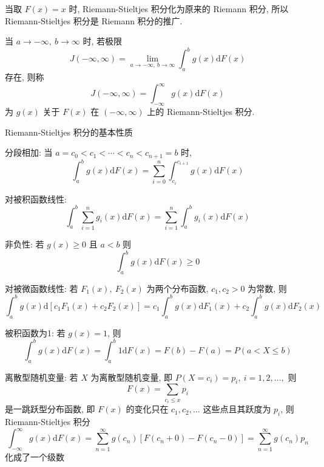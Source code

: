 \documentclass[openany]{ctexbook}
\theoremstyle{kaiti}
\theoremstyle{normal}
\begin{document}
当取 $F(x)=x$ 时, Riemann-Stieltjes 积分化为原来的 Riemann 积分, 所以 Riemann-Stieltjes 积分是 Riemann 积分的推广.

当 $a\to-\infty,~b\to\infty$ 时, 若极限
\begin{equation}
  J(-\infty,\infty)=\lim_{a\to-\infty,~b\to\infty}\int_a^bg(x)\mathrm{d}F(x)
\end{equation}
 存在, 则称
\begin{equation}
  J(-\infty,\infty)=\int_{-\infty}^\infty g(x)\mathrm{d}F(x)
\end{equation}
 为 $g(x)$ 关于 $F(x)$ 在 $(-\infty,\infty)$ 上的 Riemann-Stieltjes 积分.

Riemann-Stieltjes 积分的基本性质

分段相加: 当 $a=c_0<c_1<\cdots<c_n<c_{n+1}=b$ 时,
\begin{equation}
  \int_a^bg(x)\mathrm{d}F(x)=\sum_{i=0}^n\int_{c_i}^{c_{i+1}}g(x)\mathrm{d}F(x)
\end{equation}


对被积函数线性:
\begin{equation}
  \int_a^b\sum_{i=1}^ng_i(x)\mathrm{d}F(x)=\sum_{i=1}^n\int_a^bg_i(x)\mathrm{d}F(x)
\end{equation}


非负性: 若 $g(x)\geqslant0$ 且 $a<b$ 则
\begin{equation}
  \int_a^bg(x)\mathrm{d}F(x)\geqslant0
\end{equation}


对被微函数线性: 若 $F_1(x),~F_2(x)$ 为两个分布函数, $c_1,c_2>0$ 为常数, 则
\begin{equation}
  \int_a^bg(x)\mathrm{d}[c_1F_1(x)+c_2F_2(x)]=c_1\int_a^bg(x)\mathrm{d}F_1(x)+c_2\int_a^bg(x)\mathrm{d}F_2(x)
\end{equation}


被积函数为1: 若 $g(x)=1$, 则
\begin{equation}
  \int_a^bg(x)\mathrm{d}F(x)=\int_a^b1\mathrm{d}F(x)=F(b)-F(a)=P(a<X\leqslant b)
\end{equation}


离散型随机变量: 若 $X$ 为离散型随机变量, 即 $P(X=c_i)=p_i,~i=1,2,\ldots,$ 则
\begin{equation}
  F(x)=\sum_{c_i\leqslant x}p_i
\end{equation}
 是一跳跃型分布函数, 即 $F(x)$ 的变化只在 $c_1,c_2,\ldots$ 这些点且其跃度为 $p_i$, 则 Riemann-Stieltjes 积分
\begin{equation}
  \int_{-\infty}^\infty g(x)\mathrm{d}F(x)=\sum_{n=1}^\infty g(c_n)[F(c_n+0)-F(c_n-0)]=\sum_{n=1}^\infty g(c_n)p_n
\end{equation}
 化成了一个级数
\end{document}
